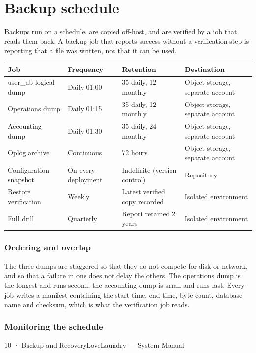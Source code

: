 \documentclass[11pt,a4paper,oneside]{book}
\begin{document}
\section*{Backup schedule}
Backups run on a schedule, are copied off-host, and are verified by a job that reads them back. A backup job that reports success without a verification step is reporting that a file was written, not that it can be used.

\begin{center}\small
\begin{tabularx}{\linewidth}{|X|X|X|X|}
\hline
\rowcolor{lightgrey}
\textbf{Job} & \textbf{Frequency} & \textbf{Retention} & \textbf{Destination} \\ \hline
user\_db logical dump & Daily 01:00 & 35 daily, 12 monthly & Object storage, separate account \\ \hline
Operations dump & Daily 01:15 & 35 daily, 12 monthly & Object storage, separate account \\ \hline
Accounting dump & Daily 01:30 & 35 daily, 24 monthly & Object storage, separate account \\ \hline
Oplog archive & Continuous & 72 hours & Object storage, separate account \\ \hline
Configuration snapshot & On every deployment & Indefinite (version control) & Repository \\ \hline
Restore verification & Weekly & Latest verified copy recorded & Isolated environment \\ \hline
Full drill & Quarterly & Report retained 2 years & Isolated environment \\ \hline
\end{tabularx}
\end{center}
\subsubsection*{Ordering and overlap}
The three dumps are staggered so that they do not compete for disk or network, and so that a failure in one does not delay the others. The operations dump is the longest and runs second; the accounting dump is small and runs last. Every job writes a manifest containing the start time, end time, byte count, database name and checksum, which is what the verification job reads.

\subsubsection*{Monitoring the schedule}
10 · Backup and RecoveryLoveLaundry — System Manual
\end{document}
